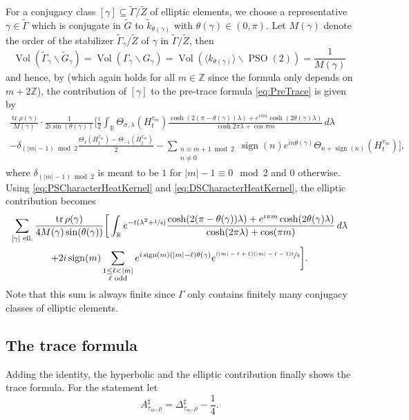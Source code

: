 \documentclass[JEP,XML,SOM,Unicode,NoFloatCountersInSection,published]{cedram}
\theoremstyle{plain}
\theoremstyle{definition}
\theoremstyle{remark}
\newcommand{\R}{\mathbb{R}}
\newcommand{\Z}{\mathbb{Z}}
\DeclareMathOperator{\PSO}{PSO}
\DeclareMathOperator{\tr}{tr}
\DeclareMathOperator{\Vol}{Vol}
\DeclareMathOperator{\sign}{sign}
\numberwithin{equation}{section}
\begin{document}
For a conjugacy class $[\gamma]\subseteq\widetilde{\Gamma}/\widetilde{Z}$ of elliptic ele\-ments, we choose a representative $\gamma\in\widetilde{\Gamma}$ which is conjugate in $\widetilde{G}$ to $\widetilde{k}_{\theta(\gamma)}$ with $\theta(\gamma)\in(0,\pi)$. Let $M(\gamma)$ denote the order of the stabilizer $\widetilde{\Gamma}_\gamma/\widetilde{Z}$ of $\gamma$ in $\widetilde{\Gamma}/\widetilde{Z}$, then
\[
\Vol(\widetilde{\Gamma}_\gamma\backslash\widetilde{G}_\gamma)=\Vol(\Gamma_\gamma\backslash G_\gamma)=\Vol(\langle k_{\theta(\gamma)}\rangle\backslash\PSO(2))=\frac{1}{M(\gamma)}
\]
and hence, by \cite[Lem.\,4]{Hof94} (which again holds for all $m\in\Z$ since the formula only depends on $m+2\Z$), the contribution of $[\gamma]$ to the pre-trace formula \cref{eq:PreTrace} is given by
\begin{multline*}
\frac{\tr\rho(\gamma)}{M(\gamma)}\cdot\frac{1}{2i\sin(\theta(\gamma))}\bigg[\frac{i}{2}\int_\R\Theta_{\sigma,\lambda}(H_t^{\tau_m})\frac{\cosh(2(\pi-\theta(\gamma))\lambda)+e^{i\pi m}\cosh(2\theta(\gamma)\lambda)}{\cosh2\pi\lambda+\cos\pi m}\,d\lambda\\
-\delta_{(|m|-1)\bmod2}\frac{\Theta_1(H_t^{\tau_m})-\Theta_{-1}(H_t^{\tau_m})}{2}
-\sum_{\substack{n\equiv m+1\bmod2\\n\neq0}}\sign(n)e^{in\theta(\gamma)}\Theta_{n+\sign(n)}(H_t^{\tau_m})\bigg],
\end{multline*}
where $\delta_{(|m|-1)\bmod2}$ is meant to be $1$ for $|m|-1\equiv0\mod2$ and $0$ otherwise. Using \cref{eq:PSCharacterHeatKernel} and \cref{eq:DSCharacterHeatKernel}, the elliptic contribution becomes
\begin{multline*}
\sum_{[\gamma]\textup{ ell.}} \frac{\tr\rho(\gamma)}{4M(\gamma)\sin(\theta(\gamma))}\bigg[\int_\R e^{-t(\lambda^2+\sfrac{1}{4})}\frac{\cosh(2(\pi-\theta(\gamma))\lambda)+e^{i\pi m}\cosh(2\theta(\gamma)\lambda)}{\cosh(2\pi\lambda)+\cos(\pi m)}\,d\lambda\\
+2i\sign(m)\sum_{\substack{1\leq\ell<|m|\\\ell\textup{ odd}}}e^{i\sign(m)(|m|-\ell)\theta(\gamma)}e^{\sfrac{(|m|-\ell+1)(|m|-\ell-1)t}{4}}\bigg].
\end{multline*}
Note that this sum is always finite since $\Gamma$ only contains finitely many conjugacy classes of elliptic elements.

\subsection{The trace formula}
\label{subsec:STF}
Adding the identity, the hyperbolic and the elliptic contribution finally shows the trace formula. For the statement let
\[
A_{\tau_m,\rho}^\sharp=\Delta_{\tau_m,\rho}^\sharp-\frac{1}{4}.
\]
\end{document}

